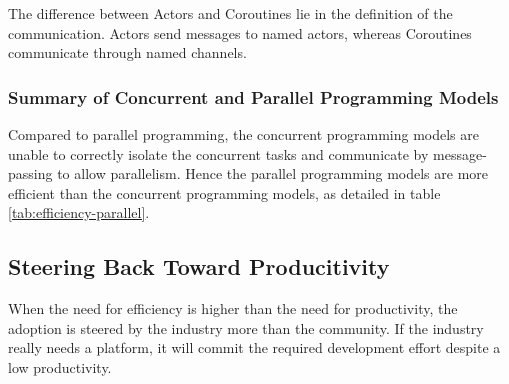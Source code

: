 The difference between Actors and Coroutines lie in the definition of the communication.
Actors send messages to named actors, whereas Coroutines communicate through named channels.

\subsubsection{Summary of Concurrent and Parallel Programming Models}

Compared to parallel programming, the concurrent programming models are unable to correctly isolate the concurrent tasks and communicate by message-passing to allow parallelism.
Hence the parallel programming models are more efficient than the concurrent programming models, as detailed in table \ref{tab:efficiency-parallel}.


\subsection{Steering Back Toward Producitivity} \label{chapter3:software-efficiency:adoption}

\begin{figure}[h!]
%
\end{figure}

When the need for efficiency is higher than the need for productivity, the adoption is steered by the industry more than the community.
If the industry really needs a platform, it will commit the required development effort despite a low productivity.


